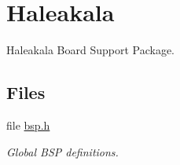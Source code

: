 \hypertarget{group__RTEMSBSPsPowerPCHaleakala}{}\section{Haleakala}
\label{group__RTEMSBSPsPowerPCHaleakala}


Haleakala Board Support Package.  


\subsection*{Files}
\begin{DoxyCompactItemize}
\item 
file \mbox{\hyperlink{bsps_2powerpc_2haleakala_2include_2bsp_8h}{bsp.\+h}}
\begin{DoxyCompactList}\small\item\em Global B\+SP definitions. \end{DoxyCompactList}\end{DoxyCompactItemize}
